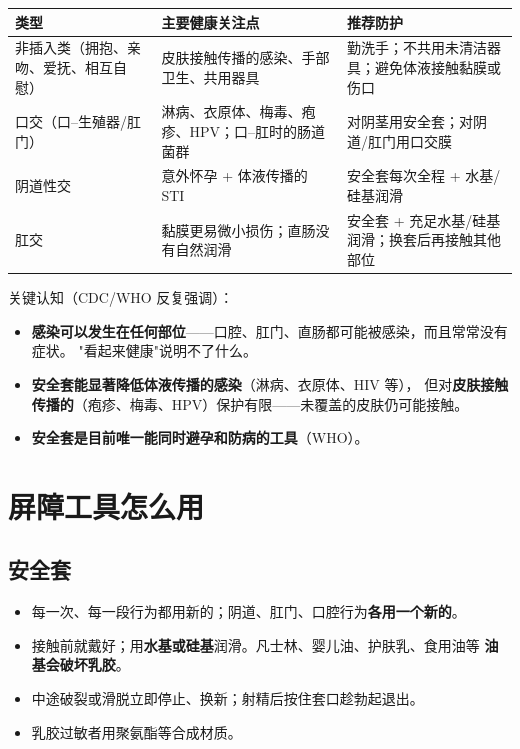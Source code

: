 \documentclass[12pt,UTF8,openany]{ctexbook}
\begin{document}
\begin{center}
\begin{tabularx}{\linewidth}{@{}l X X@{}}
\toprule
\textbf{类型} & \textbf{主要健康关注点} & \textbf{推荐防护} \\
\midrule
非插入类（拥抱、亲吻、爱抚、相互自慰）
  & 皮肤接触传播的感染、手部卫生、共用器具
  & 勤洗手；不共用未清洁器具；避免体液接触黏膜或伤口 \\
\addlinespace
口交（口--生殖器/肛门）
  & 淋病、衣原体、梅毒、疱疹、HPV；口--肛时的肠道菌群
  & 对阴茎用安全套；对阴道/肛门用口交膜 \\
\addlinespace
阴道性交
  & 意外怀孕 + 体液传播的 STI
  & 安全套每次全程 + 水基/硅基润滑 \\
\addlinespace
肛交
  & 黏膜更易微小损伤；直肠没有自然润滑
  & 安全套 + 充足水基/硅基润滑；换套后再接触其他部位 \\
\bottomrule
\end{tabularx}
\end{center}

关键认知（CDC/WHO 反复强调）：

\begin{itemize}[leftmargin=2em]
  \item \textbf{感染可以发生在任何部位}——口腔、肛门、直肠都可能被感染，而且常常没有症状。
        "看起来健康"说明不了什么。
  \item \textbf{安全套能显著降低体液传播的感染}（淋病、衣原体、HIV 等），
        但对\textbf{皮肤接触传播的}（疱疹、梅毒、HPV）保护有限——未覆盖的皮肤仍可能接触。
  \item \textbf{安全套是目前唯一能同时避孕和防病的工具}（WHO）。
\end{itemize}

\section{屏障工具怎么用}

\subsection*{安全套}

\begin{itemize}[leftmargin=2em]
  \item 每一次、每一段行为都用新的；阴道、肛门、口腔行为\textbf{各用一个新的}。
  \item 接触前就戴好；用\textbf{水基或硅基}润滑。凡士林、婴儿油、护肤乳、食用油等
        \textbf{油基会破坏乳胶}。
  \item 中途破裂或滑脱立即停止、换新；射精后按住套口趁勃起退出。
  \item 乳胶过敏者用聚氨酯等合成材质。
\end{itemize}
\end{document}
